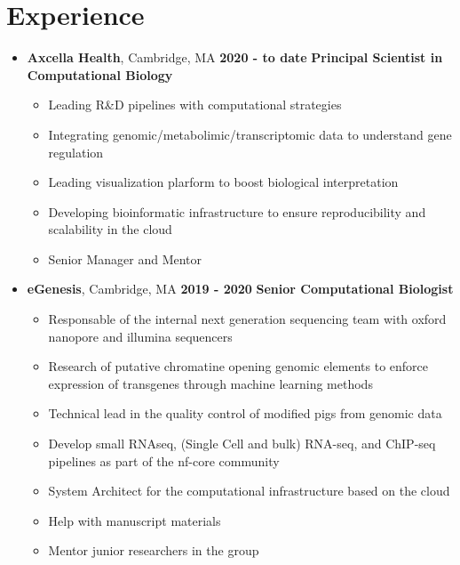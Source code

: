 \hypertarget{experience}{%
\section{Experience}\label{experience}}

\begin{itemize}

\item
\textbf{Axcella Health}, Cambridge, MA \hfill \textbf{2020 - to date}
\newline
\textbf{Principal Scientist in Computational Biology}
\begin{itemize}
\item
  Leading R\&D pipelines with computational strategies
\item
  Integrating genomic/metabolimic/transcriptomic data to understand gene regulation
\item 
  Leading visualization plarform to boost biological interpretation
\item 
  Developing bioinformatic infrastructure to ensure reproducibility and scalability in the cloud
\item
  Senior Manager and Mentor
\end{itemize}

\item
\textbf{eGenesis}, Cambridge, MA \hfill \textbf{2019 - 2020}
\newline
\textbf{Senior Computational Biologist}
 \begin{itemize}

\item
  Responsable of the internal next generation sequencing team with oxford nanopore and illumina sequencers
\item
  Research of putative chromatine opening genomic elements to enforce expression of transgenes through machine learning methods
\item
  Technical lead in the quality control of modified pigs from genomic data
\item 
  Develop small RNAseq, (Single Cell and bulk) RNA-seq, and ChIP-seq pipelines
  as part of the nf-core community
\item System Architect for the computational infrastructure based on the cloud
\item
  Help with manuscript materials
\item Mentor junior researchers in the group
 \end{itemize}



\end{itemize}
